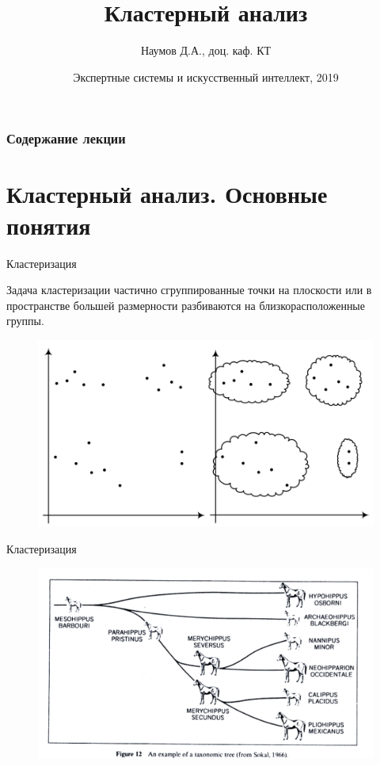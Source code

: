 \documentclass{beamer}
\title[Artifical Intelligence]{Кластерный анализ}
\author{Наумов Д.А., доц. каф. КТ}
\date[04.12.2019] {Экспертные системы и искусственный интеллект, 2019}
\begin{document}
\begin{frame}
  \titlepage
\end{frame}
  
\begin{frame}
  \frametitle{Содержание лекции}
  \tableofcontents  
\end{frame}

\section{Кластерный анализ. Основные понятия}

\begin{frame}{Кластеризация}
\begin{block}{Задача кластеризации}
частично сгруппированные точки на плоскости или в пространстве большей размерности разбиваются на близкорасположенные группы.
\end{block}
\begin{figure}[h]
\centering
\includegraphics[scale=0.4]{images/lec07-pic01.png}
\end{figure}
\end{frame}

\begin{frame}{Кластеризация}
\begin{figure}[h]
\centering
\includegraphics[scale=0.4]{images/lec07-pic06.png}
\end{figure}
\end{frame}
\end{document}

